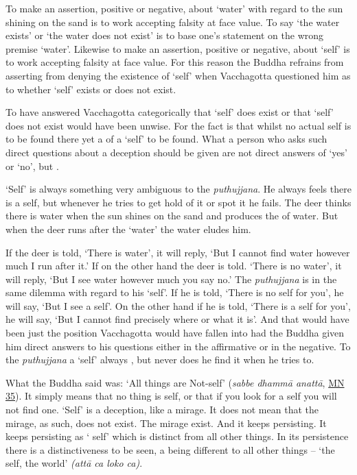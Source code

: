 To make an assertion, positive or negative, about `water' with regard to the sun shining on the sand is to work accepting falsity at face value. To say `the water exists' or `the water does not exist' is to base one's statement on the wrong premise `water'. Likewise to make an assertion, positive or negative, about `self' is to work accepting falsity at face value. For this reason the Buddha refrains  from asserting  from denying the existence of `self' when Vacchagotta questioned him as to whether `self' exists or does not exist.

To have answered Vacchagotta categorically that `self' does exist or that `self' does not exist would have been unwise. For the fact is that whilst no actual self is to be found there yet  a  of a `self' to be found. What a person who asks such direct questions about a deception should be given are not direct answers of `yes' or `no', but .

`Self' is always something very ambiguous to the \emph{puthujjana}. He always feels there is a self, but whenever he tries to get hold of it or spot it he fails. The deer thinks there is water when the sun shines on the sand and produces the  of water. But when the deer runs after the `water' the water eludes him.

If the deer is told, `There is water', it will reply, `But I cannot find water however much I run after it.' If on the other hand the deer is told. `There is no water', it will reply, `But I see water however much you say no.' The \emph{puthujjana} is in the same dilemma with regard to his `self'. If he is told, `There is no self for you', he will say, `But I see a self'. On the other hand if he is told, `There is a self for you', he will say, `But I cannot find precisely where or what it is'. And that would have been just the position Vacchagotta would have fallen into had the Buddha given him direct answers to his questions either in the affirmative or in the negative. To the \emph{puthujjana} a `self' always , but never does he find it when he tries to.

What the Buddha said was: `All things are Not-self' (\emph{sabbe dhammā anattā}, \href{https://suttacentral.net/mn35/en/sujato}{MN 35}). It simply means that no thing is self, or that if you look for a self you will not find one. `Self' is a deception, like a mirage. It does not mean that the mirage, as such, does not exist. The mirage  exist. And it keeps persisting. It keeps persisting as ` self' which is distinct from all other things. In its persistence there is a distinctiveness to be seen, a being different to all other things -- `the self, the world' \emph{(attā ca loko ca)}.

